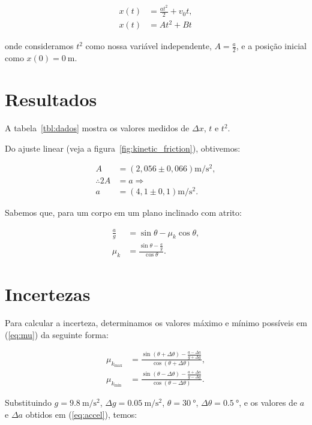 \documentclass[10pt,oneside,twocolumn,a4paper]{article}
\begin{document}
\begin{align}
	x(t) &= \frac{at^2}{2} + v_0t, \nonumber \\
	x(t) &= At^2 + Bt
\end{align}

onde consideramos $t^2$ como nossa variável independente, $A = \frac{a}{2}$, e
a posição inicial como $x(0) = \SI{0}{\meter}$.

\section{Resultados}

A tabela~\ref{tbl:dados} mostra os valores medidos de $\Delta x$, $t$ e
$t^2$.

Do ajuste linear (veja a figura~\ref{fig:kinetic_friction}), obtivemos:

\begin{align}\label{eq:accel}
	A &= \left( 2,056 \pm 0,066 \right) \si{\metre\per\second\squared}, \nonumber \\
	\therefore 2A &= a \Rightarrow \nonumber \\
	a &= \left( 4,1 \pm 0,1 \right) \si{\metre\per\second\squared}.
\end{align}

Sabemos que, para um corpo em um plano inclinado com atrito:

\begin{align}\label{eq:mu}
	\frac{a}{g} &= \sin\theta - \mu_k \cos\theta, \nonumber \\
	\mu_k &= \frac{\sin\theta - \frac{a}{g}}{\cos\theta}.
\end{align}

\section{Incertezas}

Para calcular a incerteza, determinamos os valores máximo e mínimo possíveis em
(\ref{eq:mu}) da seguinte forma:

\begin{align*}
	\mu_{k_\text{max}} &= \frac{\sin(\theta + \Delta\theta) - \frac{a - \Delta a}{g + \Delta g}}{\cos(\theta + \Delta\theta)}, \\
	\mu_{k_\text{min}} &= \frac{\sin(\theta - \Delta\theta) - \frac{a + \Delta a}{g - \Delta g}}{\cos(\theta - \Delta\theta)}.
\end{align*}


Substituindo $g = \SI{9.8}{\meter\per\second\squared}$, $\Delta g =
\SI{0.05}{\meter\per\second\squared}$, $\theta = \SI{30}{\degree}$,
$\Delta\theta = \SI{0.5}{\degree}$, e os valores de $a$ e $\Delta a$ obtidos em
(\ref{eq:accel}), temos:
\end{document}

